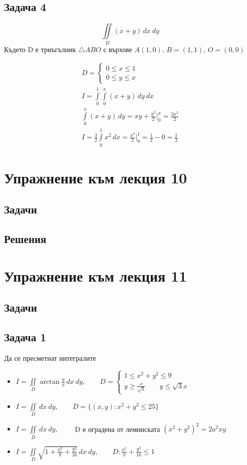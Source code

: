 \documentclass[a4paper,fleqn,12pt]{article}
\theoremstyle{definition}
\begin{document}
\subsection*{Задача 4}
$$\iint\limits_D (x+y) \, dx \ dy$$
Където D е триъгълник $\triangle ABO$ с върхове $A(1,0),\, B = (1,1),\, O = (0,0)$

\begin{gather*}
D = \begin{cases} 0 \leq x \leq 1 \\ 0\leq y \leq x \end{cases} \\
I = \int\limits_0 ^1 \int\limits_{0} ^{x} (x+y)\, dy \ dx\\
\int\limits_{0} ^{x} (x+y)\, dy =
 xy + \frac{y^2}{2} \Big|_{0} ^{x} = \frac{3x^2}{2} \\
I = \frac{3}{2}  \int\limits_0 ^1 x^2 \,dx = 
\frac{x^3}{2}\Big|_0 ^1 = \frac{1}{2} - 0 = \frac{1}{2}
\end{gather*}

\newpage 
\section{Упражнение към лекция 10}

\subsection{Задачи}

\newpage
\subsection{Решения}

\newpage 
\section{Упражнение към лекция 11}

\subsection{Задачи}

\subsection*{Задача 1}
Да се пресметнат интегралите 
\begin{itemize}
\item $I = \iint\limits_D \arctan \frac{y}{x} \, dx \ dy, \qquad 
D = \begin{cases} 1 \leq x^2 + y^2 \leq 9 \\ y \geq \frac{x}{\sqrt{3}} \qquad y \leq \sqrt{3}x \end{cases} $
\item $I = \iint\limits_D \, dx \ dy, \qquad
 D = \{ (x,y) : x^2 +y^2 \leq 25 \}$ 
\item $I = \iint\limits_D \, dx \ dy, \qquad$ 
D е оградена от лемниската $(x^2 + y^2)^2 = 2a^2 xy$ 
\item $I = \iint\limits_D\sqrt{1 + \frac{x^2}{9} + \frac{y^2}{16}} \, dx \ dy , \qquad
D: \frac{x^2}{9} + \frac{y^2}{16} \leq 1$
\end{itemize}
\end{document}
